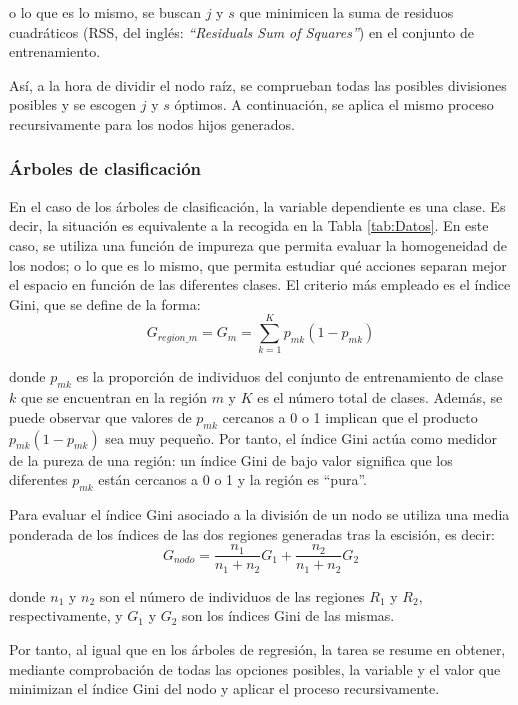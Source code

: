 \documentclass[12pt,twoside]{article}
\begin{document}
\noindent
o lo que es lo mismo, se buscan $j$ y $s$ que minimicen la suma de residuos cuadráticos (RSS, del inglés: \textit{``Residuals Sum of Squares''}) en el conjunto de entrenamiento.

Así, a la hora de dividir el nodo raíz, se comprueban todas las posibles divisiones posibles y se escogen $j$ y $s$ óptimos. A continuación, se aplica el mismo proceso recursivamente para los nodos hijos generados.


\subsubsection{Árboles de clasificación}
En el caso de los árboles de clasificación, la variable dependiente es una clase. Es decir, la situación es equivalente a la recogida en la Tabla \ref{tab:Datos}. En este caso, se utiliza una función de impureza que permita evaluar la homogeneidad de los nodos; o lo que es lo mismo, que permita estudiar qué acciones separan mejor el espacio en función de las diferentes clases. El criterio más empleado es el índice Gini, que se define de la forma:
\begin{equation*}
G_{region\_m} = G_m = \sum_{k=1}^K p_{mk}(1 - p_{mk})
\end{equation*}

\noindent
donde $p_{mk}$ es la proporción de individuos del conjunto de entrenamiento de clase $k$ que se encuentran en la región $m$ y $K$ es el número total de clases. Además, se puede observar que valores de $p_{mk}$ cercanos a 0 o 1 implican que el producto $p_{mk}(1- p_{mk})$ sea muy pequeño. Por tanto, el índice Gini actúa como medidor de la pureza de una región: un índice Gini de bajo valor significa que los diferentes $p_{mk}$ están cercanos a 0 o 1 y la región es ``pura''.

Para evaluar el índice Gini asociado a la división de un nodo se utiliza una media ponderada de los índices de las dos regiones generadas tras la escisión, es decir:
\begin{equation*}
G_{nodo} = \frac{n_1}{n_1 + n_2}G_1 + \frac{n_2}{n_1 + n_2}G_2
\end{equation*}

\noindent
donde  $n_1$ y $n_2$ son el número de individuos de las regiones $R_1$ y $R_2$, respectivamente, y $G_1$ y $G_2$ son los índices Gini de las mismas. 

Por tanto, al igual que en los árboles de regresión, la tarea se resume en obtener, mediante comprobación de todas las opciones posibles, la variable y el valor que minimizan el índice Gini del nodo y aplicar el proceso recursivamente.
\end{document}

